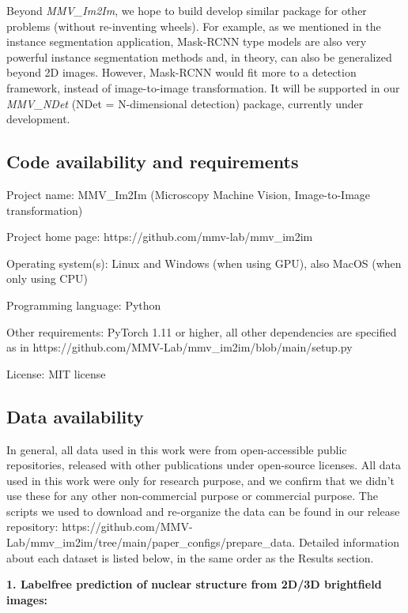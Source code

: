 Beyond \emph{MMV\_Im2Im}, we hope to build develop similar package for other problems (without re-inventing wheels). For example, as we mentioned in the instance segmentation application, Mask-RCNN type models are also very powerful instance segmentation methods and, in theory, can also be generalized beyond 2D images. However, Mask-RCNN would fit more to a detection framework, instead of image-to-image transformation. It will be supported in our \emph{MMV\_NDet} (NDet = N-dimensional detection) package, currently under development.

\hypertarget{code-availability-and-requirements}{%
\subsection{Code availability and requirements}\label{code-availability-and-requirements}}

Project name: MMV\_Im2Im (Microscopy Machine Vision, Image-to-Image transformation)

Project home page: https://github.com/mmv-lab/mmv\_im2im

Operating system(s): Linux and Windows (when using GPU), also MacOS (when only using CPU)

Programming language: Python

Other requirements: PyTorch 1.11 or higher, all other dependencies are specified as in https://github.com/MMV-Lab/mmv\_im2im/blob/main/setup.py

License: MIT license

\hypertarget{data-availability}{%
\subsection{Data availability}\label{data-availability}}

In general, all data used in this work were from open-accessible public repositories, released with other publications under open-source licenses. All data used in this work were only for research purpose, and we confirm that we didn't use these for any other non-commercial purpose or commercial purpose. The scripts we used to download and re-organize the data can be found in our release repository: https://github.com/MMV-Lab/mmv\_im2im/tree/main/paper\_configs/prepare\_data. Detailed information about each dataset is listed below, in the same order as the Results section.

\textbf{1. Labelfree prediction of nuclear structure from 2D/3D brightfield images:}


